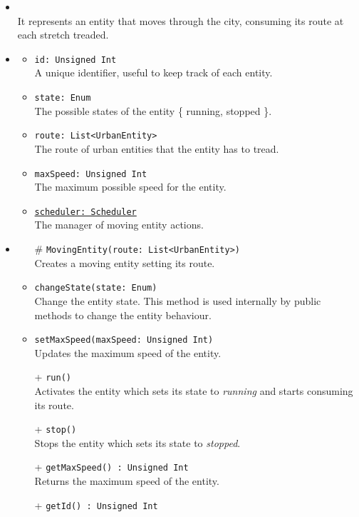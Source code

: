 \begin{itemize}
  \item \textbf{\descr} \\
    It represents an entity that moves through the city, consuming its 
route at each stretch treaded.
  \item \textbf{\attrs}
  \begin{itemize}
    \item \texttt{id: Unsigned Int} \\
A unique identifier, useful to keep track of each entity.
    \item \texttt{state: Enum} \\
The possible states of the entity \{ running, stopped \}.
    \item \texttt{route: List<UrbanEntity>} \\
The route of urban entities that the entity has to tread.
    \item \texttt{maxSpeed: Unsigned Int} \\
The maximum possible speed for the entity.
    \item \texttt{\underline{scheduler: Scheduler}} \\
The manager of moving entity actions.
  \end{itemize}
  \item \textbf{\ops}
  \begin{itemize}
  \item[\#]  \texttt{MovingEntity(route: List<UrbanEntity>)} \\
Creates a moving entity setting its route.
    \item \texttt{changeState(state: Enum)} \\
Change the entity state. This method is used internally by public methods to 
change the entity behaviour.
    \item \texttt{setMaxSpeed(maxSpeed: Unsigned Int)} \\
Updates the maximum speed of the entity.
    \item[+]  \texttt{run()} \\
Activates the entity which sets its state to \textit{running} and 
starts consuming its route.
    \item[+]  \texttt{stop()} \\
Stops the entity which sets its state to \textit{stopped}.
   \item[+] \texttt{getMaxSpeed() : Unsigned Int} \\
Returns the maximum speed of the entity.
     \item[+] \texttt{getId() : Unsigned Int} \\

\end{itemize}
\end{itemize}
